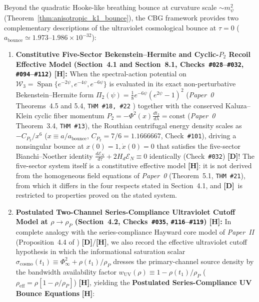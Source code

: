 \documentclass[11pt,a4paper]{article}
\newcommand{\catD}{\textbf{\textcolor{blue!75!black}{[D]}}}
\newcommand{\catH}{\textbf{\textcolor{orange!85!black}{[H]}}}
\theoremstyle{plain}
\theoremstyle{definition}
\theoremstyle{remark}
\numberwithin{equation}{section}
\begin{document}
Beyond the quadratic Hooke-like breathing bounce at curvature scale $\sim m_{\psi}^2$ (Theorem~\ref{thm:anisotropic_k1_bounce}), the CBG framework provides two complementary descriptions of the ultraviolet cosmological bounce at $\tau = 0$ ($a_{\text{bounce}} \simeq 1.973\text{--}1.986 \times 10^{-32}$):
\begin{enumerate}
  \item \textbf{Constitutive Five-Sector Bekenstein--Hermite and Cyclic-$P_2$ Recoil Effective Model (Section~4.1 and Section~8.1, Checks~\texttt{\#028}--\texttt{\#032}, \texttt{\#094}--\texttt{\#112}) \catH:} When the spectral-action potential on $\mathcal{W}_3 = \operatorname{Span}\{e^{-2\psi}, e^{-4\psi}, e^{-6\psi}\}$ is evaluated in its exact non-perturbative Bekenstein--Hermite form $\Pi_2(\psi) = \frac{1}{8}e^{-6\psi}(e^{2\psi}-1)^2$ (\textit{Paper~0} Theorems~4.5 and 5.4, \texttt{THM \#18, \#22} \cite{jimenez2026_p0}) together with the conserved Kaluza--Klein cyclic fiber momentum $P_2 = -\Phi^2(x)\frac{dt_2}{d\lambda} = \text{const}$ (\textit{Paper~0} Theorem~3.4, \texttt{THM \#13}), the Routhian centrifugal energy density scales as $-C_{P_2}/x^6$ ($x \equiv a/a_{\text{bounce}}$, $C_{P_2} = 7/6 = 1.1666667$, Check~\texttt{\#101}), driving a nonsingular bounce at $x(0) = 1, \dot{x}(0) = 0$ that satisfies the five-sector Bianchi--Noether identity $\frac{d\mathcal{E}_N}{d\tau} + 2H_d\mathcal{E}_N \equiv 0$ identically (Check~\texttt{\#032}) \catD! The five-sector system itself is a constitutive effective model \catH: it is not derived from the homogeneous field equations of \textit{Paper~0} (Theorem~5.1, \texttt{THM \#21}), from which it differs in the four respects stated in Section~4.1, and \catD\ is restricted to properties proved on the stated system.
  \item \textbf{Postulated Two-Channel Series-Compliance Ultraviolet Cutoff Model at $\rho \to \rho_P$ (Section~4.2, Checks~\texttt{\#035}, \texttt{\#116}--\texttt{\#119}) \catH:} In complete analogy with the series-compliance Hayward core model of \textit{Paper~II} (Proposition~4.4 of \cite{jimenez2026b}) \catD/\catH, we also record the effective ultraviolet cutoff hypothesis in which the informational saturation scalar $\sigma_{\text{cosmo}}(t_1) \equiv \Phi_{\infty}^2 + \rho(t_1)/\rho_P$ dresses the primary-channel source density by the bandwidth availability factor $w_{\text{UV}}(\rho) \equiv 1 - \rho(t_1)/\rho_P$ ($\rho_{\text{eff}} = \rho[1 - \rho/\rho_P]$) \catH, yielding the \textbf{Postulated Series-Compliance UV Bounce Equations} \catH:
\end{enumerate}
\end{document}
